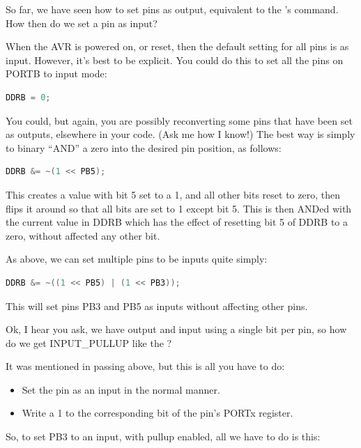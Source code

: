 So far, we have seen how to set pins as output, equivalent to the 's  command. How then do we set a pin as input?

When the AVR is powered on, or reset, then the default setting for all pins is as input. However, it's best to be explicit. You could do this to set all the pins on PORTB to input mode:

\begin{lstlisting}[language=C,numbers={none}]
	DDRB = 0;
\end{lstlisting}

You could, but again, you are possibly reconverting some pins that have been set as outputs, elsewhere in your code. (Ask me how I know!) The best way is simply to binary ``AND'' a zero into the desired pin position, as follows:

\begin{lstlisting}[language=C,numbers={none}]
	DDRB &= ~(1 << PB5);
\end{lstlisting}

This creates a value with bit 5 set to a 1, and all other bits reset to zero, then flips it around so that all bits are set to 1 except bit 5. This is then ANDed with the current value in DDRB which has the effect of resetting bit 5 of DDRB to a zero, without affected any other bit.

As above, we can set multiple pins to be inputs quite simply:

\begin{lstlisting}[language=C,numbers={none}]
	DDRB &= ~((1 << PB5) | (1 << PB3));
\end{lstlisting}

This will set pins PB3 and PB5 as inputs without affecting other pins.

Ok, I hear you ask, we have output and input using a single bit per pin, so how do we get INPUT\_PULLUP like the ?

It was mentioned in passing above, but this is all you have to do:

\begin{itemize}
	\item Set the pin as an input in the normal manner.
	\item Write a 1 to the corresponding bit of the pin's PORTx register.
\end{itemize}

So, to set PB3 to an input, with pullup enabled, all we have to do is this:

